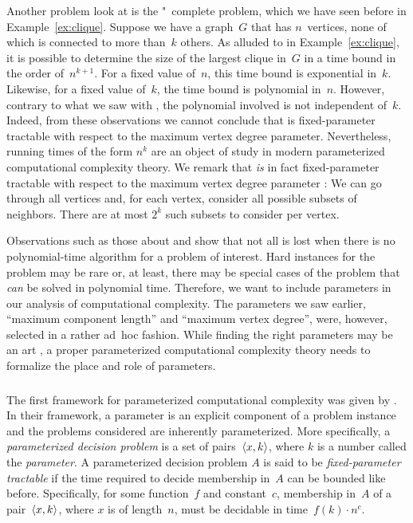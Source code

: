 Another problem \citeauthor{garey1979computers} look at is the "~complete  problem, which we have seen before in Example~\ref{ex:clique}.
Suppose we have a graph~$G$ that has $n$~vertices, none of which is connected to more than~$k$ others.
As alluded to in Example~\ref{ex:clique}, it is possible to determine the size of the largest clique in~$G$ in a time bound in the order of~$n^{k + 1}$.
For a fixed value of~$n$, this time bound is exponential in~$k$.
Likewise, for a fixed value of~$k$, the time bound is polynomial in~$n$.
However, contrary to what we saw with , the polynomial involved is not independent of~$k$.
Indeed, from these observations we cannot conclude that  is fixed-parameter tractable with respect to the maximum vertex degree parameter.
Nevertheless, running times of the form $n^k$ are an object of study in modern parameterized computational complexity theory.
We remark that  \emph{is} in fact fixed-parameter tractable with respect to the maximum vertex degree parameter \parencite[10]{cygan2015parameterized}:
We can go through all vertices and, for each vertex, consider all possible subsets of neighbors.
There are at most $2^k$ such subsets to consider per vertex.

Observations such as those about  and  show that not all is lost when there is no polynomial-time algorithm for a problem of interest.
Hard instances for the problem may be rare or, at least, there may be special cases of the problem that \emph{can} be solved in polynomial time.
Therefore, we want to include parameters in our analysis of computational complexity.
The parameters we saw earlier, \enquote{maximum component length} and \enquote{maximum vertex degree}, were, however, selected in a rather ad~hoc fashion.
While finding the right parameters may be an art \parencite[12]{cygan2015parameterized}, a proper parameterized computational complexity theory needs to formalize the place and role of parameters.

\subsubsection{\citeauthor{downey1999parameterized}}
The first framework for parameterized computational complexity was given by \textcite{downey1992fixed,downey1999parameterized}.
In their framework, a parameter is an explicit component of a problem instance and the problems considered are inherently parameterized.
More specifically, a \emph{parameterized decision problem} is a set of pairs~${\langle x, k\rangle}$, where $k$ is a number called the \emph{parameter}.
A parameterized decision problem $A$ is said to be \emph{fixed-parameter tractable} if the time required to decide membership in~$A$ can be bounded like before.
Specifically, for some function~$f$ and constant~$c$, membership in~$A$ of a pair~${\langle x, k\rangle}$, where $x$ is of length~$n$, must be decidable in time~$f(k) \cdot n^c$.

